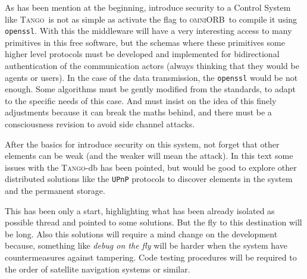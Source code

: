\documentclass[10pt,a4paper,twoside]{llncs}
\newcommand{\tango}{\textsc{Tango}}
\newcommand{\omniorb}{\textsc{omniORB}}
\begin{document}
As has been mention at the beginning, introduce security to a Control System like \tango\, is not as simple as activate the flag to \omniorb\, to compile it using {\tt openssl}. With this the middleware will have a very interesting access to many primitives in this free software, but the schemas where these primitives some higher level protocols must be developed and implemented for bidirectional authentication of the communication actors (always thinking that they would be agents or users). In the case of the data transmission, the {\tt openssl} would be not enough. Some algorithms must be gently modified from the standards, to adapt to the specific needs of this case. And must insist on the idea of this finely adjustments because it can break the maths behind, and there must be a consciousness revision to avoid side channel attacks.

After the basics for introduce security on this system, not forget that other elements can be weak (and the weaker will mean the attack). In this text some issues with the \tango-db has been pointed, but would be good to explore other distributed solutions like the {\tt UPnP} protocols to discover elements in the system and the permanent storage.

This has been only a start, highlighting what has been already isolated as possible thread and pointed to some solutions. But the fly to this destination will be long. Also this solutions will require a mind change on the development because, something like \emph{debug on the fly} will be harder when the system have countermeasures against tampering. Code testing procedures will be required to the order of satellite navigation systems or similar.



\end{document}
